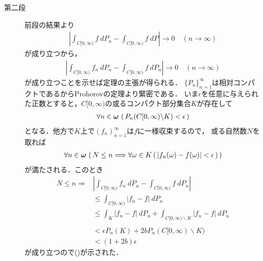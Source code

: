 \begin{sketch}
\begin{description}
			\item[第二段]
				前段の結果より
				\begin{align}
					\left| \int_{C[0,\infty)} f\ dP_n
					- \int_{C[0,\infty)} f\ dP\right|
					\longrightarrow 0 \quad (n \longrightarrow \infty)
				\end{align}
				が成り立つから，
				\begin{align}
					\left|\int_{C[0,\infty)} f_n\ dP_n
					- \int_{C[0,\infty)} f\ dP_n\right|
					\longrightarrow 0 \quad (n \longrightarrow \infty)
					\label{eq:chapter_2_Problem_4_12}
				\end{align}
				が成り立つことを示せば定理の主張が得られる．
				$\{P_n\}_{n=1}^\infty$は相対コンパクトであるからProhorovの定理より緊密である．
				いま$\epsilon$を任意に与えられた正数とすると，$C[0,\infty)$の或るコンパクト部分集合$K$が存在して
				\begin{align}
					\forall n \in {\boldsymbol \omega}\, \left(\, P_n(C[0,\infty) \backslash K) < \epsilon\, \right)
				\end{align}
				となる．他方で$K$上で$(f_n)_{n=1}^\infty$は$f$に一様収束するので，
				或る自然数$N$を取れば
				\begin{align}
					\forall n \in {\boldsymbol \omega}\, \left(\, N \leq n
					\Longrightarrow \forall \omega \in K\, (\, |f_n(\omega) - f(\omega)| < \epsilon\, )\, \right)
				\end{align}
				が満たされる．このとき
				\begin{align}
					N \leq n \Longrightarrow
					&\left| \int_{C[0,\infty)} f_n\ dP_n
					- \int_{C[0,\infty)} f\ dP_n\right| \\
					&\leq \int_{C[0,\infty)} |f_n - f|\ dP_n \\
					&\leq \int_K |f_n - f|\ dP_n + \int_{C[0,\infty) \backslash K} |f_n - f|\ dP_n \\ \\
					&< \epsilon P_n(K) + 2b P_n(C[0,\infty) \backslash K) \\
					&< (1+2b) \epsilon
				\end{align}
				が成り立つので()が示された．
				\QED
		\end{description}
	\end{sketch}
